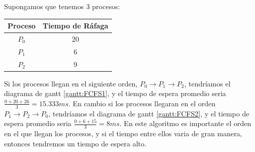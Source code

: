 \documentclass{article}
\begin{document}
Supongamos que tenemos 3 procesos:
\begin{center}
	\begin{tabular}{|c|c|} \hline
		Proceso & Tiempo de Ráfaga \\ \hline
		$P_{0}$ & 20 \\
		$P_{1}$ & 6 \\
		$P_{2}$ & 9 \\ \hline
	\end{tabular}
\end{center}

\vspace{0.4cm}

Si los procesos llegan en el siguiente orden, $P_{0} \rightarrow P_{1} \rightarrow P_{2}$, tendríamos el diagrama de gantt \ref{gantt:FCFS1},
y el tiempo de espera promedio seria $\frac{0 + 20 + 26}{3} = 15.333ms$. \newline
En cambio si los procesos llegaran en el orden $P_{1} \rightarrow P_{2} \rightarrow P_{0}$, tendríamos el diagrama de gantt \ref{gantt:FCFS2},
y el tiempo de espera promedio seria $\frac{0 + 6 + 15}{3} = 8ms$. \newline
En este algoritmo es importante el orden en el que llegan los procesos, y si el tiempo entre ellos varia de gran manera, entonces tendremos
un tiempo de espera alto.

\vspace{0.4cm}
\end{document}
